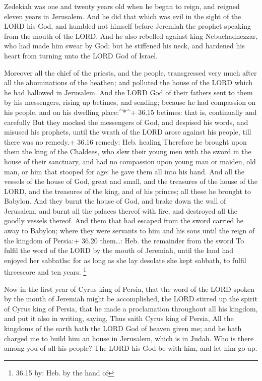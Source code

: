  Zedekiah was one and twenty years old when he began to
reign, and reigned eleven years in Jerusalem.  And he did
that which was evil in the sight of the LORD his God, and humbled not
himself before Jeremiah the prophet speaking from the mouth of the LORD.
 And he also rebelled against king Nebuchadnezzar, who had
made him swear by God: but he stiffened his neck, and hardened his heart
from turning unto the LORD God of Israel.

 Moreover all the chief of the priests, and the people,
transgressed very much after all the abominations of the heathen; and
polluted the house of the LORD which he had hallowed in Jerusalem.
 And the LORD God of their fathers sent to them by his
messengers, rising up betimes, and sending; because he had compassion on
his people, and on his dwelling place:\^{}*\^{}+ 36.15 betimes: that is,
continually and carefully  But they mocked the messengers
of God, and despised his words, and misused his prophets, until the
wrath of the LORD arose against his people, till there was no remedy.+
36.16 remedy: Heb. healing  Therefore he brought upon them
the king of the Chaldees, who slew their young men with the sword in the
house of their sanctuary, and had no compassion upon young man or
maiden, old man, or him that stooped for age: he gave them all into his
hand.  And all the vessels of the house of God, great and
small, and the treasures of the house of the LORD, and the treasures of
the king, and of his princes; all these he brought to Babylon.
 And they burnt the house of God, and brake down the wall
of Jerusalem, and burnt all the palaces thereof with fire, and destroyed
all the goodly vessels thereof.  And them that had escaped
from the sword carried he away to Babylon; where they were servants to
him and his sons until the reign of the kingdom of Persia:+ 36.20
them\ldots: Heb. the remainder from the sword  To fulfil
the word of the LORD by the mouth of Jeremiah, until the land had
enjoyed her sabbaths: for as long as she lay desolate she kept sabbath,
to fulfil threescore and ten years. \footnote{36.15 by: Heb. by the hand
  of}

 Now in the first year of Cyrus king of Persia, that the
word of the LORD spoken by the mouth of Jeremiah might be accomplished,
the LORD stirred up the spirit of Cyrus king of Persia, that he made a
proclamation throughout all his kingdom, and put it also in writing,
saying,  Thus saith Cyrus king of Persia, All the kingdoms
of the earth hath the LORD God of heaven given me; and he hath charged
me to build him an house in Jerusalem, which is in Judah. Who is there
among you of all his people? The LORD his God be with him, and let him
go up.
